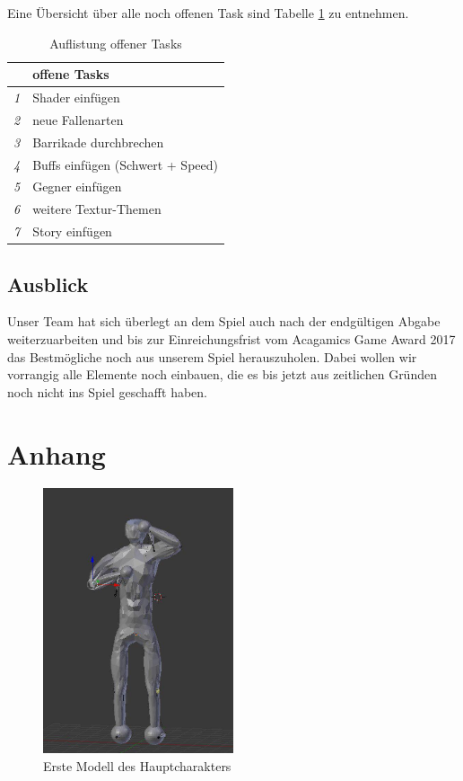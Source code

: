 \documentclass[10pt]{article}
\begin{document}
\noindent Eine Übersicht über alle noch offenen Task sind Tabelle \ref{tbl:tasks} zu entnehmen.
\begin{table}
	\centering
	\begin{tabular}{p{0.5cm}p{9cm}}
		\textbf{ }  & \textbf{offene Tasks} \\
		\hline
		\textit{1}          & \textnormal{Shader einfügen}            \\
		\textit{2}          & \textnormal{neue Fallenarten}            \\
		\textit{3}          & \textnormal{Barrikade durchbrechen}      \\
		\textit{4}          & \textnormal{Buffs einfügen (Schwert + Speed)}  \\
		\textit{5}          & \textnormal{Gegner einfügen}            \\
		\textit{6}          & \textnormal{weitere Textur-Themen}  \\ 
		\textit{7}          & \textnormal{Story einfügen}  \\ 
		\hline
	\end{tabular}
	\caption{Auflistung offener Tasks}	
	\label{tbl:tasks}	
\end{table}


\vspace{0.5cm}
\subsection{Ausblick}
Unser Team hat sich überlegt an dem Spiel auch nach der endgültigen Abgabe weiterzuarbeiten und bis zur Einreichungsfrist vom Acagamics Game Award 2017 das Bestmögliche noch aus unserem Spiel herauszuholen.
Dabei wollen wir vorrangig alle Elemente noch einbauen, die es bis jetzt aus zeitlichen Gründen noch nicht ins Spiel geschafft haben.

\newpage
\section{Anhang}

\begin{figure}[H]
	\centering
	\includegraphics[width=0.5\textwidth]{lowPoly}
	\caption{Erste Modell des Hauptcharakters
		\label{fig:lowpoly}}
\end{figure}
\end{document}
